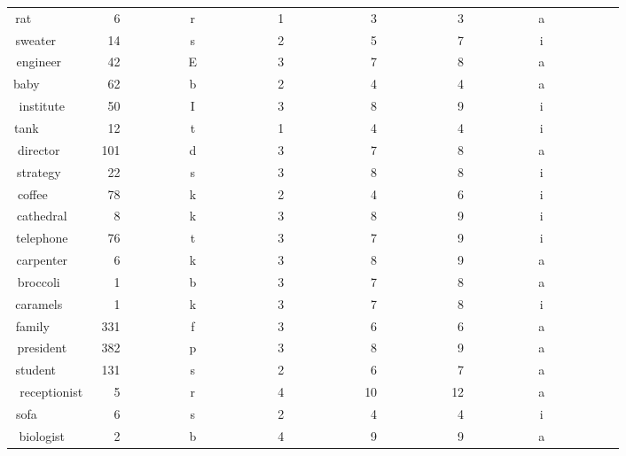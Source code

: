 \begin{longtable}{|c|c|c|c|c|c|c|}
rat~~~~~~~~~&~~6~~~~~~~~~&r~~~~~~~~~~~&1~~~~~~~~~~~&~3~~~~~~~~~~&~3~~~~~~~~~~&a~~~~~~~~~~~\\ 
sweater~~~~~&~14~~~~~~~~~&s~~~~~~~~~~~&2~~~~~~~~~~~&~5~~~~~~~~~~&~7~~~~~~~~~~&i~~~~~~~~~~~\\ 
engineer~~~~&~42~~~~~~~~~&E~~~~~~~~~~~&3~~~~~~~~~~~&~7~~~~~~~~~~&~8~~~~~~~~~~&a~~~~~~~~~~~\\ 
baby~~~~~~~~&~62~~~~~~~~~&b~~~~~~~~~~~&2~~~~~~~~~~~&~4~~~~~~~~~~&~4~~~~~~~~~~&a~~~~~~~~~~~\\ 
institute~~~&~50~~~~~~~~~&I~~~~~~~~~~~&3~~~~~~~~~~~&~8~~~~~~~~~~&~9~~~~~~~~~~&i~~~~~~~~~~~\\ 
tank~~~~~~~~&~12~~~~~~~~~&t~~~~~~~~~~~&1~~~~~~~~~~~&~4~~~~~~~~~~&~4~~~~~~~~~~&i~~~~~~~~~~~\\ 
director~~~~&101~~~~~~~~~&d~~~~~~~~~~~&3~~~~~~~~~~~&~7~~~~~~~~~~&~8~~~~~~~~~~&a~~~~~~~~~~~\\ 
strategy~~~~&~22~~~~~~~~~&s~~~~~~~~~~~&3~~~~~~~~~~~&~8~~~~~~~~~~&~8~~~~~~~~~~&i~~~~~~~~~~~\\ 
coffee~~~~~~&~78~~~~~~~~~&k~~~~~~~~~~~&2~~~~~~~~~~~&~4~~~~~~~~~~&~6~~~~~~~~~~&i~~~~~~~~~~~\\ 
cathedral~~~&~~8~~~~~~~~~&k~~~~~~~~~~~&3~~~~~~~~~~~&~8~~~~~~~~~~&~9~~~~~~~~~~&i~~~~~~~~~~~\\ 
telephone~~~&~76~~~~~~~~~&t~~~~~~~~~~~&3~~~~~~~~~~~&~7~~~~~~~~~~&~9~~~~~~~~~~&i~~~~~~~~~~~\\ 
carpenter~~~&~~6~~~~~~~~~&k~~~~~~~~~~~&3~~~~~~~~~~~&~8~~~~~~~~~~&~9~~~~~~~~~~&a~~~~~~~~~~~\\ 
broccoli~~~~&~~1~~~~~~~~~&b~~~~~~~~~~~&3~~~~~~~~~~~&~7~~~~~~~~~~&~8~~~~~~~~~~&a~~~~~~~~~~~\\ 
caramels~~~~&~~1~~~~~~~~~&k~~~~~~~~~~~&3~~~~~~~~~~~&~7~~~~~~~~~~&~8~~~~~~~~~~&i~~~~~~~~~~~\\ 
family~~~~~~&331~~~~~~~~~&f~~~~~~~~~~~&3~~~~~~~~~~~&~6~~~~~~~~~~&~6~~~~~~~~~~&a~~~~~~~~~~~\\ 
president~~~&382~~~~~~~~~&p~~~~~~~~~~~&3~~~~~~~~~~~&~8~~~~~~~~~~&~9~~~~~~~~~~&a~~~~~~~~~~~\\ 
student~~~~~&131~~~~~~~~~&s~~~~~~~~~~~&2~~~~~~~~~~~&~6~~~~~~~~~~&~7~~~~~~~~~~&a~~~~~~~~~~~\\ 
receptionist&~~5~~~~~~~~~&r~~~~~~~~~~~&4~~~~~~~~~~~&10~~~~~~~~~~&12~~~~~~~~~~&a~~~~~~~~~~~\\ 
sofa~~~~~~~~&~~6~~~~~~~~~&s~~~~~~~~~~~&2~~~~~~~~~~~&~4~~~~~~~~~~&~4~~~~~~~~~~&i~~~~~~~~~~~\\ 
biologist~~~&~~2~~~~~~~~~&b~~~~~~~~~~~&4~~~~~~~~~~~&~9~~~~~~~~~~&~9~~~~~~~~~~&a~~~~~~~~~~~\\ 

\end{longtable}
